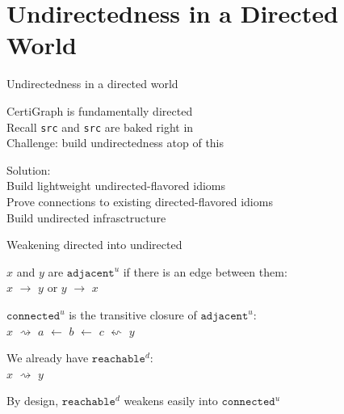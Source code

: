\documentclass[usenames, xcolor=dvipsnames]{beamer}
\newcommand{\m}[1]{\ensuremath{\mathit{#1}}} %
\begin{document}
\section{Undirectedness in a Directed World}

\begin{frame}[fragile]{Undirectedness in a directed world}

CertiGraph is fundamentally directed \\
Recall \texttt{src} and \texttt{src} are baked right in \\
Challenge: build undirectedness atop of this

\pause \bigskip

Solution: \\
\hspace{1em} Build lightweight undirected-flavored idioms \\
\hspace{1em} Prove connections to existing directed-flavored idioms \\
\hspace{1em} Build undirected infrasctructure

\end{frame}

\begin{frame}{Weakening directed into undirected}

\m{x} and \m{y} are $\texttt{adjacent}^{u}$ if there is an edge between them: \\
\hspace{1em} \m{x} $\rightarrow$ \m{y} or \m{y} $\rightarrow$ \m{x} \\

\pause \bigskip

$\texttt{connected}^{u}$ is the transitive closure of $\texttt{adjacent}^{u}$: \\
\hspace{1em} \m{x} $\rightsquigarrow$ \m{a} $\leftarrow$ \m{b} $\leftarrow$ \m{c} $\leftsquigarrow$ \m{y} \\

\pause \bigskip

We already have $\texttt{reachable}^{d}$: \\
\hspace{1em} \m{x} $\rightsquigarrow$ \m{y}

\pause \bigskip

By design, $\texttt{reachable}^{d}$ weakens easily into $\texttt{connected}^{u}$

\end{frame}
\end{document}
